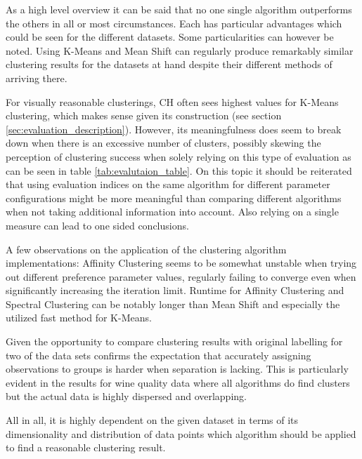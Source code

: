 As a high level overview it can be said that no one single algorithm outperforms the others in all or most circumstances. Each has particular advantages which could be seen for the different datasets. Some particularities can however be noted. Using K-Means and Mean Shift can regularly produce remarkably similar clustering results for the datasets at hand despite their different methods of arriving there. 

For visually reasonable clusterings, \gls{CH} often sees highest values for K-Means clustering, which makes sense given its construction (see section \ref{sec:evaluation_description}). However, its meaningfulness does seem to break down when there is an excessive number of clusters, possibly skewing the perception of clustering success when solely relying on this type of evaluation as can be seen in table \ref{tab:evalutaion_table}. On this topic it should be reiterated that using evaluation indices on the same algorithm for different parameter configurations might be more meaningful than comparing different algorithms when not taking additional information into account. Also relying on a single measure can lead to one sided conclusions.

A few observations on the application of the clustering algorithm implementations: Affinity Clustering seems to be somewhat unstable when trying out different preference parameter values, regularly failing to converge even when significantly increasing the iteration limit. Runtime for Affinity Clustering and Spectral Clustering can be notably longer than Mean Shift and especially the utilized fast method for K-Means.

Given the opportunity to compare clustering results with original labelling for two of the data sets confirms the expectation that accurately assigning observations to groups is harder when separation is lacking. This is particularly evident in the results for wine quality data where all algorithms do find clusters but the actual data is highly dispersed and overlapping.

All in all, it is highly dependent on the given dataset in terms of its dimensionality and distribution of data points which algorithm should be applied to find a reasonable clustering result.

